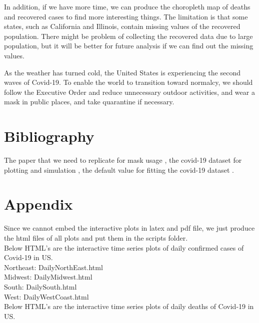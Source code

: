 \documentclass{article}
\begin{document}
In addition, if we have more time, we can produce the choropleth map of deaths and recovered cases to find more interesting things. The limitation is that some states, such as California and Illinois, contain missing values of the recovered population. There might be problem of collecting the recovered data due to large population, but it will be better for future analysis if we can find out the missing values. 


As the weather has turned cold, the United States is experiencing the second waves of Covid-19. To enable the world to transition toward normalcy, we should follow the Executive Order and reduce unnecessary outdoor activities, and wear a mask in public places, and take quarantine if necessary. 





\section{Bibliography}
The paper that we need to replicate for mask usage \cite{Steff2020mask},  the covid-19 dataset for plotting and simulation \cite{Johnhopkins}, the default value for fitting the covid-19 dataset \cite{Cooper2020SIR}.


\printbibliography






\section{Appendix}

Since we cannot embed the interactive plots in latex and pdf file, we just produce the html files of all plots and put them in the scripts folder.\\

\noindent
Below HTML's are the interactive time series plots of daily confirmed cases of Covid-19 in US.\\

Northeast: DailyNorthEast.html\\

Midwest: DailyMidwest.html\\

South: DailySouth.html\\

West: DailyWestCoast.html\\



\noindent
Below HTML's are the interactive time series plots of daily deaths of Covid-19 in US. \\
\end{document}
